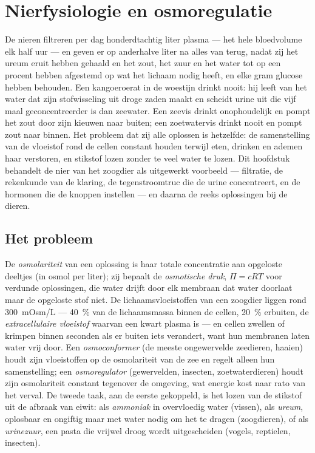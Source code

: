 \chapter{Nierfysiologie en osmoregulatie}\label{ch:b3:renal-osmoregulation}

De nieren filtreren per dag honderdtachtig liter plasma --- het hele
bloedvolume elk half uur --- en geven er op anderhalve liter na alles
van terug, nadat zij het ureum eruit hebben gehaald en het zout, het
zuur en het water tot op een procent hebben afgestemd op wat het
lichaam nodig heeft, en elke gram glucose hebben behouden. Een
kangoeroerat in de woestijn drinkt nooit: hij leeft van het water dat
zijn stofwisseling uit droge zaden maakt en scheidt urine uit die vijf
maal geconcentreerder is dan zeewater. Een zeevis drinkt onophoudelijk
en pompt het zout door zijn kieuwen naar buiten; een zoetwatervis
drinkt nooit en pompt zout naar binnen. Het probleem dat zij alle
oplossen is hetzelfde: de samenstelling van de vloeistof rond de cellen
constant houden terwijl eten, drinken en ademen haar verstoren, en
stikstof lozen zonder te veel water te lozen. Dit hoofdstuk behandelt
de nier van het zoogdier als uitgewerkt voorbeeld --- filtratie, de
rekenkunde van de klaring, de tegenstroomtruc die de urine
concentreert, en de hormonen die de knoppen instellen --- en daarna de
reeks oplossingen bij de dieren.

\section{Het probleem}

\begin{definition}[Osmoregulatie]\label{def:b3:renal-osmoregulation:problem}
De \emph{osmolariteit} van een oplossing is haar totale concentratie
aan opgeloste deeltjes (in osmol per liter); zij bepaalt de
\emph{osmotische druk}, $\Pi = cRT$ voor verdunde oplossingen, die
water drijft door elk membraan dat water doorlaat maar de opgeloste
stof niet. De lichaamsvloeistoffen van een zoogdier liggen rond
\qty{300}{mOsm/L} --- \qty{40}{\%} van de lichaamsmassa binnen de
cellen, \qty{20}{\%} erbuiten, de \emph{extracellulaire vloeistof}
waarvan een kwart plasma is --- en cellen zwellen of krimpen binnen
seconden als er buiten iets verandert, want hun membranen laten water
vrij door. Een \emph{osmoconformer} (de meeste ongewervelde zeedieren,
haaien) houdt zijn vloeistoffen op de osmolariteit van de zee en regelt
alleen hun samenstelling; een \emph{osmoregulator} (gewervelden,
insecten, zoetwaterdieren) houdt zijn osmolariteit constant tegenover
de omgeving, wat energie kost naar rato van het verval. De tweede taak,
aan de eerste gekoppeld, is het lozen van de stikstof uit de afbraak
van eiwit: als \emph{ammoniak} in overvloedig water (vissen), als
\emph{ureum}, oplosbaar en ongiftig maar met water nodig om het te
dragen (zoogdieren), of als \emph{urinezuur}, een pasta die vrijwel
droog wordt uitgescheiden (vogels, reptielen, insecten).
\end{definition}

